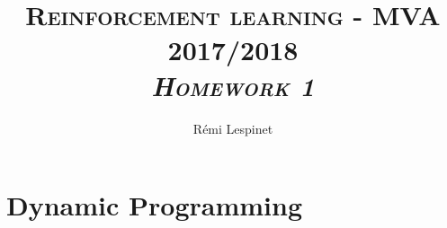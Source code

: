 \documentclass[a4paper, 11pt]{article}
\title{\textsc{Reinforcement learning - MVA 2017/2018 \\ \emph{Homework 1}} }
\author{Rémi Lespinet}
\date{}
\begin{document}
\maketitle
\thispagestyle{fancy}









\section{Dynamic Programming}
\end{document}
